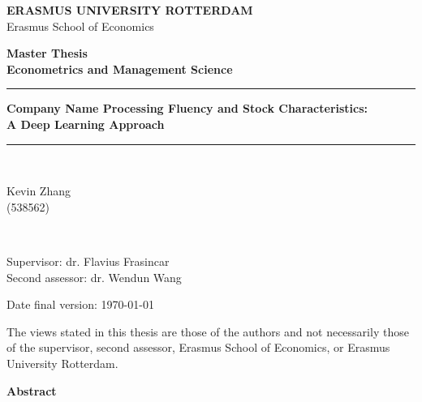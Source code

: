\documentclass[11pt]{article}
\begin{document}
\begin{titlepage}
   \begin{center}
       \vspace{1cm}

       \Large
       \textbf{ERASMUS UNIVERSITY ROTTERDAM}\\
       Erasmus School of Economics
            
       \vspace{0.5cm}
       \normalsize \textbf{Master Thesis} \\
       \textbf{Econometrics and Management Science}

       \vspace{1cm}
       \rule{\linewidth}{2pt}
       \Large 
       \textbf{Company Name Processing Fluency and Stock Characteristics:\\ A Deep Learning Approach}
       \rule{\linewidth}{2pt}
        
       \vspace{0.5cm}
       
    \end{center}
\\  
\begin{center}
Kevin Zhang \\
\small(538562)\\
\end{center}
\\
\begin{center}
Supervisor: dr. Flavius Frasincar\\        
Second assessor: dr. Wendun Wang\\
\end{center}
      
    \begin{center}
        \vspace{0.25cm}
        
                Date final version: \today

        \vspace{0.25cm} 

        \small 
        The views stated in this thesis are those of the 
        authors and not necessarily those of the 
        supervisor, second assessor, Erasmus School of 
        Economics, or Erasmus University Rotterdam.
            
   \vspace{0.5cm}
   
    \large 
    \textbf{Abstract}
   

\end{center}
\end{titlepage}
\end{document}
